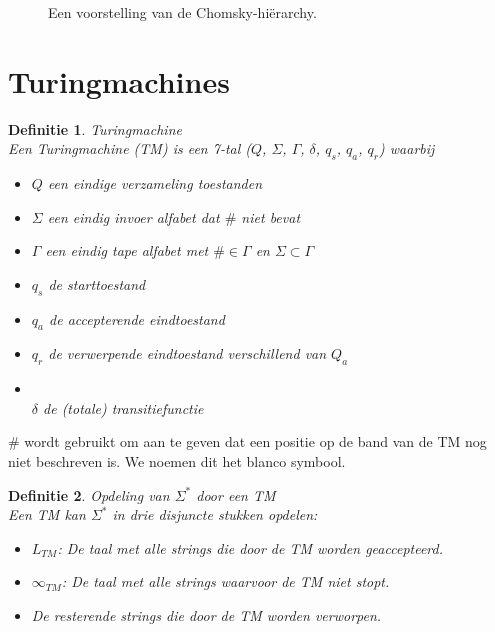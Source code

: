 \documentclass[a4paper]{article}
\newtheorem{tdefinitie}{Definitie}[section]
\newenvironment{definitie}[1]%
  {\begin{mdframed}[backgroundcolor=silver,
    topline=false,
    rightline=false,
    leftline=false,
    bottomline=false]\begin{tdefinitie}#1\\\normalfont}%
  {\end{tdefinitie}\end{mdframed}}
\newcommand{\powerset}{\ensuremath{\mathcal{P}}}
\newcommand{\sstar}{\ensuremath{\Sigma^*}}
\begin{document}
\begin{figure}[ht]
\centering
  \caption{Een voorstelling van de Chomsky-hi\"erarchy.}
\end{figure}

\newpage\section{Turingmachines}

\begin{definitie}{Turingmachine}
  \label{def:tm}
  Een Turingmachine (TM) is een 7-tal ($Q$, $\Sigma$, $\Gamma$, $\delta$, $q_s$, $q_a$, $q_r$) waarbij
  \begin{itemize}
  \item $Q$ een eindige verzameling toestanden
  \item $\Sigma$ een eindig invoer alfabet dat $\#$ niet bevat
  \item $\Gamma$ een eindig tape alfabet met $\# \in \Gamma$ en $\Sigma \subset \Gamma$
  \item $q_s$ de starttoestand
  \item $q_a$ de accepterende eindtoestand
  \item $q_r$ de verwerpende eindtoestand verschillend van $Q_a$
  \item {}\\$\delta$ de (totale) transitiefunctie
  \end{itemize}
\end{definitie}

$\#$ wordt gebruikt om aan te geven dat een positie op de band van de TM nog niet beschreven is. We noemen dit het blanco symbool.


\begin{definitie}{Opdeling van $\sstar$ door een TM}
  Een TM kan $\sstar$ in drie disjuncte stukken opdelen:
  \begin{itemize}
  \item $L_{TM}$: De taal met alle strings die door de TM worden geaccepteerd.
  \item $\infty_{TM}$: De taal met alle strings waarvoor de TM niet stopt.
  \item De resterende strings die door de TM worden verworpen.
  \end{itemize}
\end{definitie}
\end{document}
